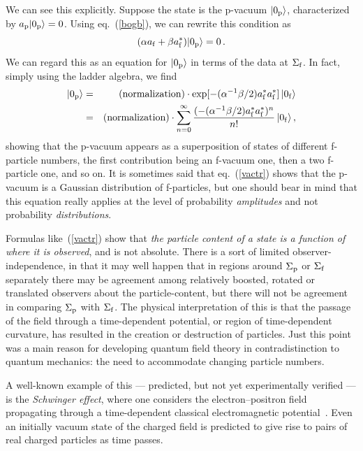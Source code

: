 \documentclass[
%
draft    %
,numberedheadings 
,bibliocites
  ]
  {aipproc}
\begin{document}
We can see this explicitly.  Suppose the state is the p-vacuum $|0_{\rm p}\rangle$, characterized by $a_{\rm p}|0_{\rm p}\rangle =0$.  Using eq.~(\ref{bogb}), we can rewrite this condition as
\begin{equation}
 (\alpha  a_{\rm f}
  +\beta a^*_{\rm f})|0_{\rm p}\rangle =0\, .
\end{equation}
We can regard this as an equation for $|0_{\rm p}\rangle$ in terms of the data at $\Sigma _{\rm f}$.  In fact, simply using the ladder algebra, we find
\begin{eqnarray}\label{vactr}
  |0_{\rm p}\rangle &=&\mbox{(normalization)}\cdot
      \exp [-(\alpha ^{-1}\beta /2)a^*_{\rm f}a^*_{\rm f}]
   \, |0_{\rm f}\rangle\\
&=&\mbox{(normalization)}\cdot 
  \sum _{n=0}^\infty \frac{(-(\alpha ^{-1}\beta /2)a^*_{\rm f}a^*_{\rm f})^n}{n!}\, 
  |0_{\rm f}\rangle \, ,
\end{eqnarray}
showing that the p-vacuum appears as a superposition of states of different f-particle numbers, the first contribution being an f-vacuum one, then a two f-particle one, and so on.  It is sometimes said that eq.~(\ref{vactr}) shows that the p-vacuum is a Gaussian distribution of 
f-particles, but one should bear in mind that this equation really applies at the level of probability {\em amplitudes} and not probability {\em distributions}.

Formulas like~(\ref{vactr}) show that {\em the particle content of a state is a function of where it is observed}, and is not absolute.  
There is a sort of limited observer-independence, in that it may well happen that in regions around $\Sigma _{\rm p}$ or $\Sigma _{\rm f}$ separately there may be agreement among relatively boosted, rotated or translated observers about the particle-content, but there will not be agreement in comparing $\Sigma _{\rm p}$ with $\Sigma _{\rm f}$.
The physical interpretation of this is that the passage of the field through a time-dependent potential, or region of time-dependent curvature, has resulted in the creation or destruction of particles.  Just this point was a main reason for developing quantum field theory in contradistinction to quantum mechanics:  the need to accommodate changing particle numbers.

A well-known example of this --- predicted, but not yet experimentally verified --- is the {\em Schwinger effect}, where one considers the electron--positron field propagating through a time-dependent classical electromagnetic potential~\citep{Schwinger:1951nm}.
Even an initially vacuum state of the charged field is predicted to give rise to pairs of real charged particles as time passes.
\end{document}
